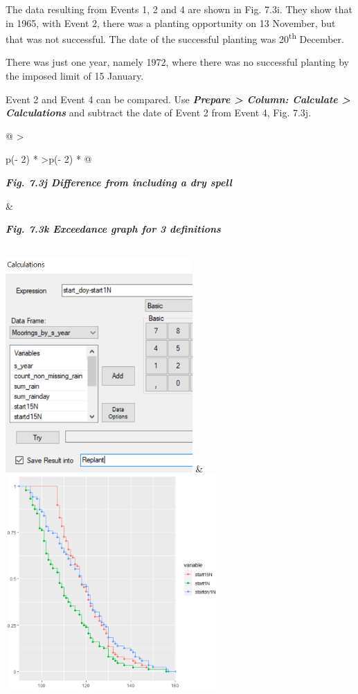 \documentclass[
  letterpaper,
  DIV=11,
  numbers=noendperiod]{scrreprt}
\begin{document}
The data resulting from Events 1, 2 and 4 are shown in Fig. 7.3i. They
show that in 1965, with Event 2, there was a planting opportunity on 13
November, but that was not successful. The date of the successful
planting was 20\textsuperscript{th} December.

There was just one year, namely 1972, where there was no successful
planting by the imposed limit of 15 January.

Event 2 and Event 4 can be compared. Use \textbf{\emph{Prepare
\textgreater{} Column: Calculate \textgreater{} Calculations}} and
subtract the date of Event 2 from Event 4, Fig. 7.3j.

\begin{longtable}[]{@{}
  >{\raggedright\arraybackslash}p{(\columnwidth - 2\tabcolsep) * }
  >{\raggedleft\arraybackslash}p{(\columnwidth - 2\tabcolsep) * }@{}}
\toprule\noalign{}
\begin{minipage}[b]{\linewidth}\raggedright
\textbf{\emph{Fig. 7.3j Difference from including a dry spell}}
\end{minipage} & \begin{minipage}[b]{\linewidth}\raggedleft
\textbf{\emph{Fig. 7.3k Exceedance graph for 3 definitions}}
\end{minipage} \\
\midrule\noalign{}
\endhead
\bottomrule\noalign{}
\endlastfoot
\includegraphics[width=2.80739in,height=3.2033in]{figures/Fig7.3j.png} &
\includegraphics[width=3.20676in,height=3.20676in]{figures/Fig7.3k.png} \\
\end{longtable}
\end{document}
